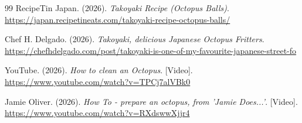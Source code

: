 \documentclass[12pt,a4paper]{report}
\begin{document}
\begin{thebibliography}{99}
 RecipeTin Japan. (2026). \textit{Takoyaki Recipe (Octopus Balls)}. \url{https://japan.recipetineats.com/takoyaki-recipe-octopus-balls/}

 Chef H. Delgado. (2026). \textit{Takoyaki, delicious Japanese Octopus Fritters}. \url{https://chefhdelgado.com/post/takoyaki-is-one-of-my-favourite-japanese-street-fo}

 YouTube. (2026). \textit{How to clean an Octopus}. [Video]. \url{https://www.youtube.com/watch?v=TPCj7alVBk0}

 Jamie Oliver. (2026). \textit{How To - prepare an octopus, from 'Jamie Does...'}. [Video]. \url{https://www.youtube.com/watch?v=RXdswwXjjr4}

\end{thebibliography}
\end{document}
